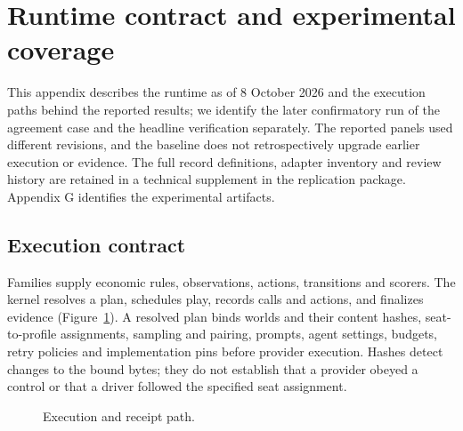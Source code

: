 \section{Runtime contract and experimental coverage}
\label{app:runtime}

This appendix describes the runtime as of 8 October 2026
and the execution paths behind the reported results; we identify the
later confirmatory run of the agreement case and the headline verification separately. The reported
panels used different revisions, and the baseline does not retrospectively
upgrade earlier execution or evidence. The full record definitions,
adapter inventory and review history are retained in a technical supplement in the
replication package. Appendix G identifies the experimental artifacts.

\subsection{Execution contract}
\label{app:runtime-overview}

Families supply economic rules, observations, actions, transitions and
scorers. The kernel resolves a plan, schedules play, records calls and
actions, and finalizes evidence (Figure~\ref{fig:runtime}). A resolved
plan binds worlds and their content hashes, seat-to-profile assignments,
sampling and pairing, prompts, agent settings, budgets, retry policies and
implementation pins before provider execution. Hashes detect changes to
the bound bytes; they do not establish that a provider obeyed a control
or that a driver followed the specified seat assignment.

\begin{figure}[htbp]
\centering
\renewcommand{\thefigure}{H.1}
\caption{Execution and receipt path.}
\label{fig:runtime}
\end{figure}


